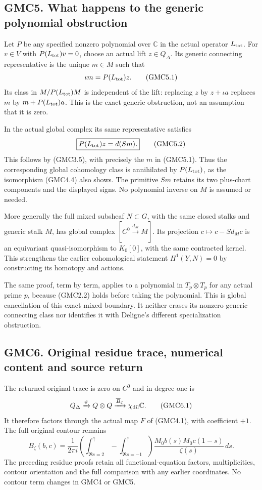 \subsection{GMC5. What happens to the generic polynomial
obstruction}\label{gmc5.-what-happens-to-the-generic-polynomial-obstruction}

Let \(P\) be any specified nonzero polynomial over \(\mathbb C\) in the
actual operator \(L_{\rm tot}\). For \(v\in V\) with
\(P(L_{\rm tot})v=0\), choose an actual lift \(z\in Q_\Delta\). Its
generic connecting representative is the unique \(m\in M\) such that \[
\iota m=P(L_{\rm tot})z.
\tag{GMC5.1}
\] Its class in \(M/P(L_{\rm tot})M\) is independent of the lift:
replacing \(z\) by \(z+\iota a\) replaces \(m\) by
\(m+P(L_{\rm tot})a\). This is the exact generic obstruction, not an
assumption that it is zero.

In the actual global complex its same representative satisfies \[
\boxed{P(L_{\rm tot})z=d(Sm).}
\tag{GMC5.2}
\] This follows by (GMC3.5), with precisely the \(m\) in (GMC5.1). Thus
the corresponding global cohomology class is annihilated by
\(P(L_{\rm tot})\), as the isomorphism (GMC4.4) also shows. The
primitive \(Sm\) retains its two plus-chart components and the displayed
signs. No polynomial inverse on \(M\) is assumed or needed.

More generally the full mixed subsheaf \(N\subset G\), with the same
closed stalks and generic stalk \(M\), has global complex
\([C^0\xrightarrow{d_M}M]\). Its projection \(c\mapsto c-Sd_Mc\) is an
equivariant quasi-isomorphism to \(K_0[0]\), with the same contracted
kernel. This strengthens the earlier cohomological statement
\(H^1(Y,N)=0\) by constructing its homotopy and actions.

The same proof, term by term, applies to a polynomial in
\(T_p\otimes T_p\) for any actual prime \(p\), because (GMC2.2) holds
before taking the polynomial. This is global cancellation of this exact
mixed boundary. It neither erases its nonzero generic connecting class
nor identifies it with Deligne's different specialization obstruction.

\subsection{GMC6. Original residue trace, numerical content and source
return}\label{gmc6.-original-residue-trace-numerical-content-and-source-return}

The returned original trace is zero on \(C^0\) and in degree one is \[
Q_\Delta\xrightarrow{\vartheta}Q\otimes Q
\xrightarrow{\overline B_\zeta}\chi_{\rm dil}\mathbb C.
\tag{GMC6.1}
\] It therefore factors through the actual map \(F\) of (GMC4.1), with
coefficient \(+1\). The full original contour remains \[
B_\zeta(b,c)=\frac{1}{2\pi i}
\left(\int_{\Re s=2}^{\uparrow}-\int_{\Re s=-1}^{\uparrow}\right)
\frac{M_0b(s)M_0c(1-s)}{\zeta(s)}\,ds.
\tag{GMC6.2}
\] The preceding residue proofs retain all functional-equation factors,
multiplicities, contour orientation and the full comparison with any
earlier coordinates. No contour term changes in GMC4 or GMC5.

